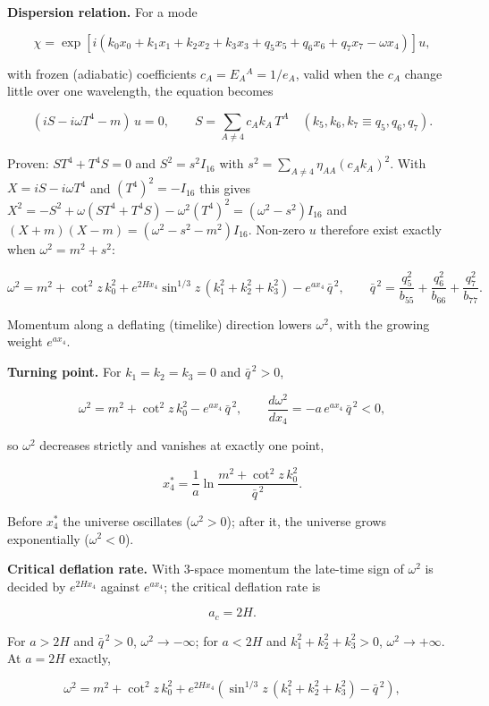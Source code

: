 \documentclass[10pt]{article}
\makeatletter
\newcommand\keepnext{\par\nopagebreak\@nobreaktrue\everypar{\@nobreakfalse\everypar{}}}
\makeatother
\begin{document}
\textbf{Dispersion relation.} For a mode\keepnext


\[
\chi = \exp\left[i\left(k_0x_0 + k_1x_1 + k_2x_2 + k_3x_3 + q_5x_5 + q_6x_6 + q_7x_7 - \omega x_4\right)\right]u ,
\]

with frozen (adiabatic) coefficients $c_A = E_A{}^A = 1/e_A$, valid when the $c_A$ change little over one wavelength, the equation becomes\keepnext


\[
(iS - i\omega T^4 - m)\,u = 0, \qquad S = \sum_{A \ne 4} c_Ak_A\,T^A \quad (k_5, k_6, k_7 \equiv q_5, q_6, q_7).
\]

Proven: $ST^4 + T^4S = 0$ and $S^2 = s^2I_{16}$ with $s^2 = \sum_{A \ne 4}\eta_{AA}(c_Ak_A)^2$. With $X = iS - i\omega T^4$ and $(T^4)^2 = -I_{16}$ this gives $X^2 = -S^2 + \omega(ST^4 + T^4S) - \omega^2(T^4)^2 = (\omega^2 - s^2)I_{16}$ and $(X + m)(X - m) = (\omega^2 - s^2 - m^2)I_{16}$. Non-zero $u$ therefore exist exactly when $\omega^2 = m^2 + s^2$:\keepnext


\[
\omega^2 = m^2 + \cot^2 z\,k_0^2 + e^{2Hx_4}\sin^{1/3}z\,(k_1^2 + k_2^2 + k_3^2) - e^{ax_4}\,\bar q^{\,2}, \qquad \bar q^{\,2} = \frac{q_5^2}{b_{55}} + \frac{q_6^2}{b_{66}} + \frac{q_7^2}{b_{77}} .
\]

Momentum along a deflating (timelike) direction lowers $\omega^2$, with the growing weight $e^{ax_4}$.


\textbf{Turning point.} For $k_1 = k_2 = k_3 = 0$ and $\bar q^{\,2} > 0$,\keepnext


\[
\omega^2 = m^2 + \cot^2 z\,k_0^2 - e^{ax_4}\,\bar q^{\,2}, \qquad \frac{d\omega^2}{dx_4} = -a\,e^{ax_4}\,\bar q^{\,2} < 0 ,
\]

so $\omega^2$ decreases strictly and vanishes at exactly one point,\keepnext


\[
x_4^* = \frac1a\ln\frac{m^2 + \cot^2 z\,k_0^2}{\bar q^{\,2}} .
\]

Before $x_4^*$ the universe oscillates ($\omega^2 > 0$); after it, the universe grows exponentially ($\omega^2 < 0$).


\textbf{Critical deflation rate.} With 3-space momentum the late-time sign of $\omega^2$ is decided by $e^{2Hx_4}$ against $e^{ax_4}$; the critical deflation rate is\keepnext


\[
a_c = 2H .
\]

For $a > 2H$ and $\bar q^{\,2} > 0$, $\omega^2 \to -\infty$; for $a < 2H$ and $k_1^2 + k_2^2 + k_3^2 > 0$, $\omega^2 \to +\infty$. At $a = 2H$ exactly,\keepnext


\[
\omega^2 = m^2 + \cot^2 z\,k_0^2 + e^{2Hx_4}\left(\sin^{1/3}z\,(k_1^2 + k_2^2 + k_3^2) - \bar q^{\,2}\right),
\]
\end{document}
